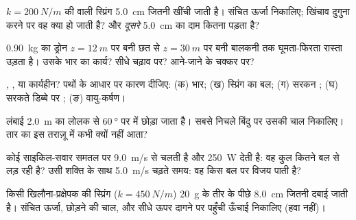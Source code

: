 \begin{exercise}[$\star$]\label{exo:g12:work-and-energy:1}
$k = \qty{200}{N/m}$ की  वाली स्प्रिंग \qty{5.0}{cm} जितनी खींची जाती है। संचित
ऊर्जा निकालिए; खिंचाव दुगुना करने पर वह क्या हो जाती है? और
\emph{दूसरे} \qty{5.0}{cm} का दाम कितना पड़ता है?
\end{exercise}

\begin{exercise}[$\star$]\label{exo:g12:work-and-energy:2}
\qty{0.90}{kg} का ड्रोन $z = \qty{12}{m}$ पर बनी छत से $z = \qty{30}{m}$ पर बनी बालकनी तक घूमता-फिरता
रास्ता उड़ता है। उसके भार का कार्य? सीधे चढ़ाव पर? आने-जाने के
चक्कर पर?
\end{exercise}

\begin{exercise}[$\star$]\label{exo:g12:work-and-energy:3}
, , या कार्यहीन? पथों के आधार पर कारण दीजिए:
(क) भार; (ख) स्प्रिंग का बल; (ग) सरकन ;
(घ) सरकते डिब्बे पर ; (ङ) वायु-कर्षण।
\end{exercise}

\begin{exercise}[$\star$]\label{exo:g12:work-and-energy:4}
लंबाई \qty{2.0}{m} का लोलक  से $\qty{60}{\degree}$ पर  में छोड़ा जाता है। सबसे
निचले बिंदु पर उसकी चाल निकालिए। तार का  इस तराज़ू में कभी क्यों
नहीं आता?
\end{exercise}

\begin{exercise}[$\star$]\label{exo:g12:work-and-energy:5}
कोई साइकिल-सवार समतल पर \qty{9.0}{m/s} से चलती है और \qty{250}{W} देती है: वह कुल कितने
 बल से लड़ रही है? उसी शक्ति के साथ
\qty{5.0}{m/s} चढ़ते समय: वह किस बल पर विजय पाती है?
\end{exercise}

\begin{exercise}[$\star\star$]\label{exo:g12:work-and-energy:6}
किसी खिलौना-प्रक्षेपक की स्प्रिंग ($k = \qty{450}{N/m}$) \qty{20}{g} के तीर के पीछे \qty{8.0}{cm}
जितनी दबाई जाती है। संचित ऊर्जा, छोड़ने की चाल, और सीधे ऊपर दागने पर
पहुँची ऊँचाई निकालिए (हवा नहीं)।
\end{exercise}


